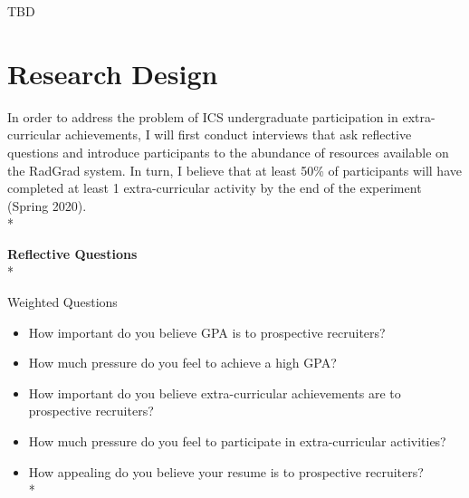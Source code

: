 \documentclass[english]{proposalnsf}
\begin{document}
  TBD

  \section{Research Design}
  \label{research-design}

  In order to address the problem of ICS undergraduate participation in extra-curricular achievements, I will first conduct interviews that ask reflective questions and introduce participants to the abundance of resources available on the RadGrad system.
  In turn, I believe that at least 50\% of participants will have completed at least 1 extra-curricular activity by the end of the experiment (Spring 2020).\\*

  \textbf{Reflective Questions}\\*

  Weighted Questions
  \begin{itemize}
    \item How important do you believe GPA is to prospective recruiters?
    \item How much pressure do you feel to achieve a high GPA?
    \item How important do you believe extra-curricular achievements are to prospective recruiters?
    \item How much pressure do you feel to participate in extra-curricular activities?
    \item How appealing do you believe your resume is to prospective recruiters?\\*
  \end{itemize}
\end{document}
